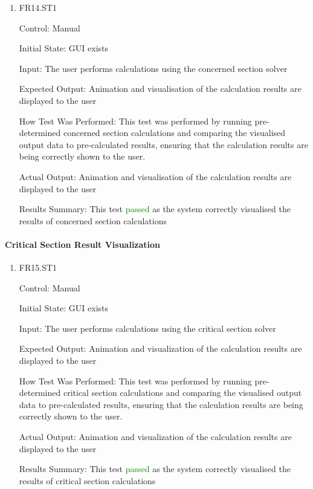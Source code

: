 \documentclass[12pt, titlepage]{article}
\begin{document}
\begin{enumerate}

\item{FR14.ST1\\}

Control: Manual
				
Initial State: GUI exists
					
Input: The user performs calculations using the concerned section solver
					
Expected Output: Animation and visualisation of the calculation results are displayed to the user

How Test Was Performed: This test was performed by running pre-determined concerned section calculations and comparing the visualised output data to pre-calculated results, ensuring that the calculation results are being correctly shown to the user. 
			
Actual Output: Animation and visualisation of the calculation results are displayed to the user

Results Summary: This test \textcolor{green} {passed} as the system correctly visualised the results of concerned section calculations
				
\end{enumerate}

\paragraph{Critical Section Result Visualization}

\begin{enumerate}

\item{FR15.ST1\\}

Control: Manual
				
Initial State: GUI exists
					
Input: The user performs calculations using the critical section solver
					
Expected Output: Animation and visualization of the calculation results are displayed to the user

How Test Was Performed: This test was performed by running pre-determined critical section calculations and comparing the visualised output data to pre-calculated results, ensuring that the calculation results are being correctly shown to the user. 
			
Actual Output: Animation and visualization of the calculation results are displayed to the user

Results Summary: This test \textcolor{green} {passed} as the system correctly visualised the results of critical section calculations
				
\end{enumerate}
\end{document}
